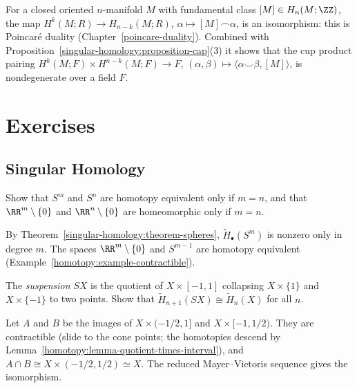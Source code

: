 \begin{remark}\label{singular-homology:remark-duality-preview}
For a closed oriented $n$-manifold $M$ with fundamental class $[M] \in H_n(M; \ZZ)$, the map $H^k(M; R) \to H_{n-k}(M; R)$, $\alpha \mapsto [M] \frown \alpha$, is an
isomorphism: this is Poincar\'e duality (Chapter~\ref{poincare-duality}). Combined with Proposition~\ref{singular-homology:proposition-cap}(3) it shows that the
cup product pairing $H^k(M; F) \times H^{n-k}(M; F) \to F$, $(\alpha, \beta) \mapsto \langle \alpha \smile \beta, [M]\rangle$, is nondegenerate over a field $F$.
\end{remark}

\section{Exercises}\label{singular-homology:section-exercises}

\subsection{Singular Homology}\label{singular-homology:subsection-exercises-singular-homology}

\begin{exercise}\label{singular-homology:exercise-spheres-not-equivalent}
Show that $S^m$ and $S^n$ are homotopy equivalent only if $m = n$, and that $\RR^m \setminus \{0\}$ and $\RR^n \setminus \{0\}$ are homeomorphic only if $m = n$.
\end{exercise}

\begin{solution}
By Theorem~\ref{singular-homology:theorem-spheres}, $\tilde{H}_\bullet(S^m)$ is nonzero only in degree $m$. The spaces $\RR^m \setminus \{0\}$ and $S^{m-1}$ are homotopy equivalent
(Example~\ref{homotopy:example-contractible}).
\end{solution}

\begin{exercise}\label{singular-homology:exercise-suspension}
The \emph{suspension} $SX$ is the quotient of $X \times [-1, 1]$ collapsing $X \times \{1\}$ and $X \times \{-1\}$ to two points. Show that $\tilde{H}_{n+1}(SX) \cong \tilde{H}_n(X)$ for
all $n$.
\end{exercise}

\begin{solution}
Let $A$ and $B$ be the images of $X \times (-1/2, 1]$ and $X \times [-1, 1/2)$. They are contractible (slide to the cone points; the homotopies descend by
Lemma~\ref{homotopy:lemma-quotient-times-interval}), and $A \cap B \cong X \times (-1/2, 1/2) \simeq X$. The reduced Mayer--Vietoris sequence gives the isomorphism.
\end{solution}

